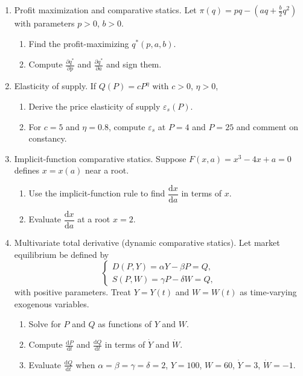 \documentclass[12pt]{article}
\newcommand{\dtotal}[2]{\frac{\mathrm{d} #1}{\mathrm{d} #2}}
\newcommand{\pd}[2]{\frac{\partial #1}{\partial #2}}
\begin{document}
\begin{enumerate}[resume]
\item Profit maximization and comparative statics. Let $\pi(q)=pq-(aq+\tfrac{b}{2}q^2)$ with parameters $p>0$, $b>0$.
\begin{enumerate}[label=(\alph*)]
  \item Find the profit-maximizing $q^*(p,a,b)$.
  \item Compute $\pd{q^*}{p}$ and $\pd{q^*}{a}$ and sign them.
\end{enumerate}

\item Elasticity of supply. If $Q(P)=cP^{\eta}$ with $c>0$, $\eta>0$,
\begin{enumerate}[label=(\alph*)]
  \item Derive the price elasticity of supply $\varepsilon_s(P)$.
  \item For $c=5$ and $\eta=0.8$, compute $\varepsilon_s$ at $P=4$ and $P=25$ and comment on constancy.
\end{enumerate}

\item Implicit-function comparative statics. Suppose $F(x,a)=x^3-4x+a=0$ defines $x=x(a)$ near a root.
\begin{enumerate}[label=(\alph*)]
  \item Use the implicit-function rule to find $\dfrac{\mathrm{d}x}{\mathrm{d}a}$ in terms of $x$.
  \item Evaluate $\dfrac{\mathrm{d}x}{\mathrm{d}a}$ at a root $x=2$.
\end{enumerate}

\item Multivariate total derivative (dynamic comparative statics). Let market equilibrium be defined by
\[
\begin{cases}
D(P,Y)=\alpha Y - \beta P = Q,\\[0.3em]
S(P,W)=\gamma P - \delta W = Q,
\end{cases}
\]
with positive parameters. Treat $Y=Y(t)$ and $W=W(t)$ as time-varying exogenous variables.
\begin{enumerate}[label=(\alph*)]
  \item Solve for $P$ and $Q$ as functions of $Y$ and $W$.
  \item Compute $\dtotal{P}{t}$ and $\dtotal{Q}{t}$ in terms of $\dot Y$ and $\dot W$.
  \item Evaluate $\dtotal{Q}{t}$ when $\alpha=\beta=\gamma=\delta=2$, $Y=100$, $W=60$, $\dot Y=3$, $\dot W=-1$.
\end{enumerate}


\end{enumerate}
\end{document}
